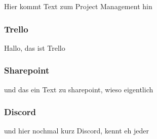 \Author{\daAuthorTwo}
Hier kommt Text zum Project Management hin

\subsubsection{Trello}

Hallo, das ist Trello

\subsubsection{Sharepoint}
und das ein Text zu sharepoint, wieso eigentlich

\subsubsection{Discord}
und hier nochmal kurz Discord, kennt eh jeder